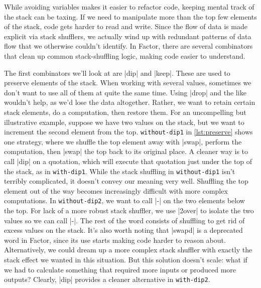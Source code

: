 While avoiding variables makes it easier to refactor code, keeping mental track
of the stack can be taxing.  If we need to manipulate more than the top few
elements of the stack, code gets harder to read and write.  Since the flow of
data is made explicit via stack shufflers, we actually wind up with redundant
patterns of data flow that we otherwise couldn't identify.  In Factor, there
are several combinators that clean up common stack-shuffling logic, making code
easier to understand.


The first combinators we'll look at are \factor|dip| and \factor|keep|.  These
are used to preserve elements of the stack.  When working with several values,
sometimes we don't want to use all of them at quite the same time.  Using
\factor|drop| and the like wouldn't help, as we'd lose the data altogether.
Rather, we want to retain certain stack elements, do a computation, then
restore them.  For an uncompelling but illustrative example, suppose we have
two values on the stack, but we want to increment the second element from the
top.  \Verb|without-dip1| in \cref{lst:preserve} shows one strategy, where we
shuffle the top element away with \factor|swap|, perform the computation, then
\factor|swap| the top back to its original place.  A cleaner way is to call
\factor|dip| on a quotation, which will execute that quotation just under the
top of the stack, as in \Verb|with-dip1|.  While the stack shuffling in
\Verb|without-dip1| isn't terribly complicated, it doesn't convey our meaning
very well.  Shuffling the top element out of the way becomes increasingly
difficult with more complex computations.  In \Verb|without-dip2|, we want to
call \factor|-| on the two elements below the top.  For lack of a more robust
stack shuffler, we use \factor|2over| to isolate the two values so we can call
\factor|-|.  The rest of the word consists of shuffling to get rid of excess
values on the stack.  It's also worth noting that \factor|swapd| is a
deprecated word in Factor, since its use starts making code harder to reason
about.  Alternatively, we could dream up a more complex stack shuffler with
exactly the stack effect we wanted in this situation.  But this solution
doesn't scale: what if we had to calculate something that required more inputs
or produced more outputs?  Clearly, \factor|dip| provides a cleaner alternative
in \Verb|with-dip2|.

